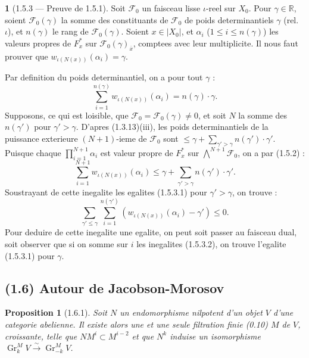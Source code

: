\documentclass[12pt,a4paper]{article}
\theoremstyle{plain}
\newtheorem{proposition}[theorem]{Proposition}
\theoremstyle{definition}
\theoremstyle{definition}
\newtheorem{para}{}[section]
\theoremstyle{remark}
\DeclareMathOperator{\Gr}{Gr}
\begin{document}
\begin{para}[1.5.3 --- Preuve de 1.5.1]
Soit $\mathscr{F}_0$ un faisceau lisse $\iota$-reel sur $X_0$. Pour $\gamma \in \mathbb{R}$, soient $\mathscr{F}_0(\gamma)$ la somme des constituants de $\mathscr{F}_0$ de poids determinantiels $\gamma$ (rel.~$\iota$), et $n(\gamma)$ le rang de $\mathscr{F}_0(\gamma)$. Soient $x \in |X_0|$, et $\alpha_i$ ($1 \leq i \leq n(\gamma)$) les valeurs propres de $F_x^*$ sur $\mathscr{F}_0(\gamma)_{\overline{x}}$, comptees avec leur multiplicite. Il nous faut prouver que $w_{\iota(N(x))}(\alpha_i) = \gamma$.

Par definition du poids determinantiel, on a pour tout $\gamma$ :
\begin{equation}\tag{1.5.3.1}
\sum_{i=1}^{n(\gamma)} w_{\iota(N(x))}(\alpha_i) = n(\gamma) \cdot \gamma.
\end{equation}
Supposons, ce qui est loisible, que $\mathscr{F}_0 = \mathscr{F}_0(\gamma) \neq 0$, et soit $N$ la somme des $n(\gamma')$ pour $\gamma' > \gamma$. D'apres (1.3.13)(iii), les poids determinantiels de la puissance exterieure $(N+1)$-ieme de $\mathscr{F}_0$ sont $\leq \gamma + \sum_{\gamma' > \gamma} n(\gamma') \cdot \gamma'$. Puisque chaque $\prod_{i=1}^{N+1} \alpha_i$ est valeur propre de $F_x^*$ sur $\bigwedge^{N+1} \mathscr{F}_0$, on a par (1.5.2) :
\[\sum_{i=1}^{N+1} w_{\iota(N(x))}(\alpha_i) \leq \gamma + \sum_{\gamma' > \gamma} n(\gamma') \cdot \gamma'.\]
Soustrayant de cette inegalite les egalites (1.5.3.1) pour $\gamma' > \gamma$, on trouve :
\begin{equation}\tag{1.5.3.2}
\sum_{\gamma' \leq \gamma} \sum_{i=1}^{n(\gamma')} (w_{\iota(N(x))}(\alpha_i) - \gamma') \leq 0.
\end{equation}
Pour deduire de cette inegalite une egalite, on peut soit passer au faisceau dual, soit observer que si on somme sur $i$ les inegalites (1.5.3.2), on trouve l'egalite (1.5.3.1) pour $\gamma$.
\end{para}

\newpage

\subsection*{(1.6) Autour de Jacobson-Morosov}

\begin{proposition}[1.6.1]
Soit $N$ un endomorphisme nilpotent d'un objet $V$ d'une categorie abelienne. Il existe alors une et une seule filtration finie (0.10) $M$ de $V$, croissante, telle que $NM^i \subset M^{i-2}$ et que $N^k$ induise un isomorphisme $\Gr_k^M V \xrightarrow{\sim} \Gr_{-k}^M V$.
\end{proposition}
\end{document}
